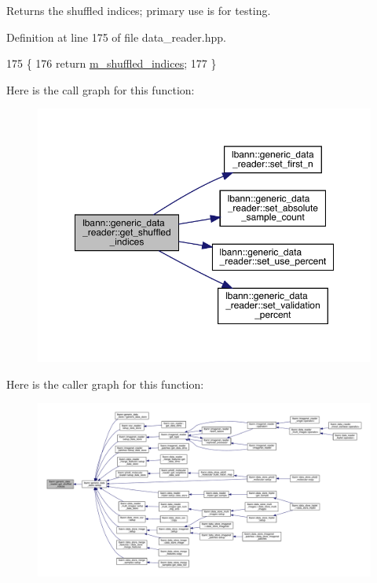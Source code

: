 Returns the shuffled indices; primary use is for testing. 

Definition at line 175 of file data\+\_\+reader.\+hpp.


\begin{DoxyCode}
175                                                       \{
176     \textcolor{keywordflow}{return} \hyperlink{classlbann_1_1generic__data__reader_aaab6aeff67ffff1c689336851fec2c57}{m\_shuffled\_indices};
177   \}
\end{DoxyCode}
Here is the call graph for this function\+:\nopagebreak
\begin{figure}[H]
\begin{center}
\leavevmode
\includegraphics[width=350pt]{classlbann_1_1generic__data__reader_a38eedaa9c8680e885a3ec05009f5f492_cgraph}
\end{center}
\end{figure}
Here is the caller graph for this function\+:\nopagebreak
\begin{figure}[H]
\begin{center}
\leavevmode
\includegraphics[width=350pt]{classlbann_1_1generic__data__reader_a38eedaa9c8680e885a3ec05009f5f492_icgraph}
\end{center}
\end{figure}
\mbox{\label{classlbann_1_1generic__data__reader_a722a28971b6799566dc21ba552a4cde6}} 
